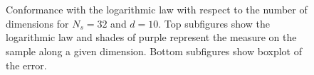 \documentclass[1p,authoryear]{elsarticle}
\begin{document}
\begin{figure}[!h]               
\centering
{}
~   


~   

\caption{Conformance with the logarithmic law with respect to the number of dimensions for $N_s=32$ and $d=10$. Top subfigures show the logarithmic law and shades of purple represent the measure on the sample along a given dimension. Bottom subfigures show boxplot of the error.}
\label{fig:boxplot}
\end{figure}
\end{document}
